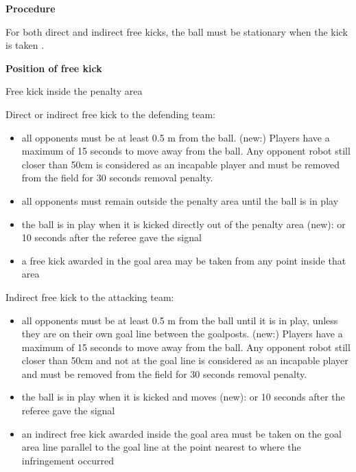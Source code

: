 {\bigskip

{\bfseries Procedure}

\headlinebox

For both direct and indirect free kicks, the ball must be stationary when the kick is taken 
.

\bigskip

{\bfseries Position of free kick }

\headlinebox

Free kick inside the penalty area

Direct or indirect free kick to the defending team:

\begin{itemize}
\item all opponents must be at least 0.5 m from the ball. (new:) Players have a maximum of 15 seconds to move away from the ball. Any opponent robot still closer than 50cm is considered as an incapable player and must be removed from the field for 30 seconds removal penalty.
\item all opponents must remain outside the penalty area until the ball is in play
\item the ball is in play when it is kicked directly out of the penalty area (new): or 10 seconds after the referee gave the signal
\item a free kick awarded in the goal area may be taken from any point inside that area
\end{itemize}

\bigskip

Indirect free kick to the attacking team:

\begin{itemize}
\item all opponents must be at least 0.5 m from the ball until it is in play, unless they are on their own goal line between the goalposts. (new:) Players have a maximum of 15 seconds to move away from the ball. Any opponent robot still closer than 50cm and not at the goal line is considered as an incapable player and must be removed from the field for 30 seconds removal penalty.
\item the ball is in play when it is kicked and moves (new): or 10 seconds after the referee gave the signal
\item an indirect free kick awarded inside the goal area must be taken on the goal area line parallel to the goal line at the point nearest to where the infringement occurred
\end{itemize}

}
